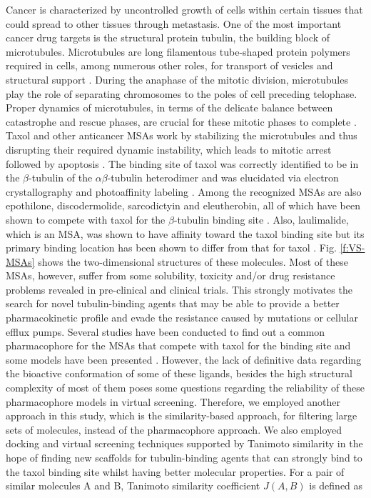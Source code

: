 \documentclass[11pt]{report}
\begin{document}
Cancer is characterized by uncontrolled growth of cells within certain tissues that could spread to other tissues through metastasis. One of the most important cancer drug targets is the structural protein tubulin, the building block of microtubules. Microtubules are long filamentous tube-shaped protein polymers required in cells, among numerous other roles, for transport of vesicles and structural support
\cite{Hayden1990}. 
During the anaphase of the mitotic division, microtubules play the role of separating chromosomes to the poles of cell preceding telophase. Proper dynamics of microtubules, in terms of the delicate balance between catastrophe and rescue phases, are crucial for these mitotic phases to complete
\cite{Hayden1990}. 
Taxol and other anticancer \glspl{MSA} work by stabilizing the microtubules and thus disrupting their required dynamic instability, which leads to mitotic arrest followed by apoptosis
\cite{Schiff1979,Schiff1980}. 
The binding site of taxol was correctly identified to be in the $\beta$-tubulin of the $\alpha\beta$-tubulin heterodimer and was elucidated via electron crystallography and
photoaffinity labeling
\cite{Nogales1998,Rao1995,Rao1999}. 
Among the recognized MSAs are also epothilone, discodermolide, sarcodictyin and eleutherobin, all of which have been shown to compete with taxol for the $\beta$-tubulin binding site
\cite{Bollag1995,Hamel1999,Kowalski1997,Buey2005}. 
Also, laulimalide, which is an MSA, was shown to have affinity toward the taxol binding site 
\cite{Pineda2004,Khrapunovich-Baine2011} but its primary binding location has been shown to differ from that for taxol
\cite{Bennett2010}. 
Fig. \ref{f:VS-MSAs}
shows the two-dimensional structures of these molecules. Most of these MSAs, however, suffer from some solubility, toxicity and/or drug resistance problems
\cite{Orr2003,Natarajan2012,Singla2002,Hopper-Borge2009} revealed in pre-clinical and clinical trials. This strongly motivates the search for novel tubulin-binding agents that may be able to provide a better pharmacokinetic profile and evade the resistance caused by mutations or cellular efflux pumps. Several studies have been conducted to find out a common pharmacophore for the MSAs that compete with taxol for the binding site and some models have been presented
\cite{Ojima1999,He2000,Giannakakou2000}. 
However, the lack of definitive data regarding the bioactive conformation of some of these ligands, besides the high structural complexity of most of them poses some questions regarding the reliability of these pharmacophore models in virtual screening. Therefore, we employed another approach in this study, which is the similarity-based approach, for filtering large sets of molecules, instead of the pharmacophore approach. We also employed docking and virtual screening techniques supported by Tanimoto similarity
\cite{Nikolova2003} in the hope of finding new scaffolds for tubulin-binding agents that can strongly bind to the taxol binding site whilst having better molecular properties. For a pair of similar molecules A and B, Tanimoto similarity coefficient $J(A,B)$ is defined as
\end{document}
